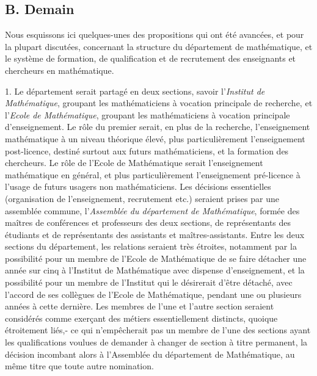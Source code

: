 \documentclass[11pt,a4paper]{article}
\begin{document}
\subsection{B. Demain}

Nous esquissons ici quelques-unes des propositions qui ont été avancées, et pour la plupart discutées, concernant la structure du département de mathématique, et le système de formation, de qualification et de recrutement des enseignants et chercheurs en mathématique.

1. Le département serait partagé en deux sections, savoir l'\emph{Institut de Mathématique}, groupant les mathématiciens à vocation principale de recherche, et l'\emph{Ecole de Mathématique}, groupant les mathématiciens à vocation principale d'enseignement. Le rôle du premier serait, en plus de la recherche, l'enseignement mathématique à un niveau théorique élevé, plus particulièrement l'enseignement post-licence, destiné surtout aux futurs mathématiciens, et la formation des chercheurs. Le rôle de l'Ecole de Mathématique serait l'enseignement mathématique en général, et plus particulièrement l'enseignement pré-licence à l'usage de futurs usagers non mathématiciens. Les décisions essentielles (organisation de l'enseignement, recrutement etc.) seraient prises par une assemblée commune, l'\emph{Assemblée du département de Mathématique}, formée des maîtres de conférences et professeurs des deux sections, de représentants des étudiants et de représentants des assistants et maîtres-assistants. Entre les deux sections du département, les relations seraient très étroites, notamment par la possibilité pour un membre de l'Ecole de Mathématique de se faire détacher une année sur cinq à l'Institut de Mathématique avec dispense d'enseignement, et la possibilité pour un membre de l'Institut qui le désirerait d'être détaché, avec l'accord de ses collègues de l'Ecole de Mathématique, pendant une ou plusieurs années à cette dernière. Les membres de l'une et l'autre section seraient considérés comme exerçant des métiers essentiellement distincts, quoique étroitement liés,- ce qui n'empêcherait pas un membre de l'une des sections ayant les qualifications voulues de demander à changer de section à titre permanent, la décision incombant alors à l'Assemblée du département de Mathématique, au même titre que toute autre nomination.
\end{document}
